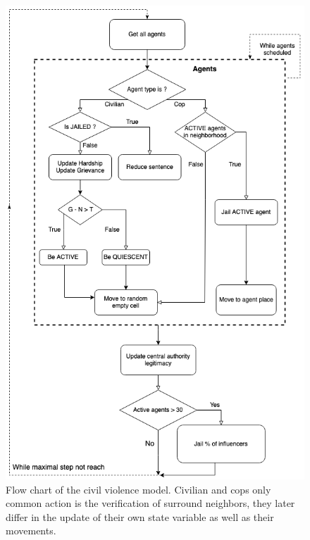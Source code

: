 \documentclass[10pt]{article}
\begin{document}
    \begin{figure}[ht!]
        \centering
        \includegraphics[width=.75\linewidth]{pictures/process_overview_scheduling/civil_violence_flow_chart_2.png}
        \caption{Flow chart of the civil violence model. Civilian and cops only common action is the verification of surround neighbors, they later differ in the update of their own state variable as well as their movements.}
        \label{fig:flow_chart_model}
    \end{figure}
\end{document}
